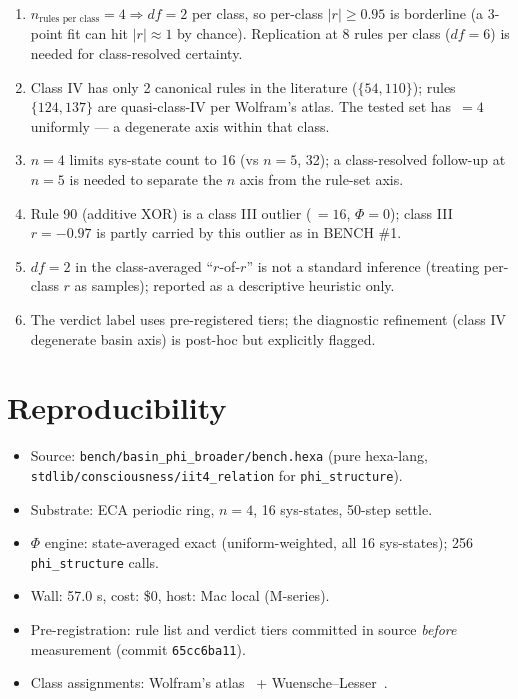 \documentclass[11pt,a4paper]{article}
\newcommand{\bigphi}{\ensuremath{\Phi}}
\newcommand{\verdictref}[1]{\texttt{\detokenize{#1}}}
\begin{document}
\begin{enumerate}
\item $n_{\text{rules per class}} = 4 \Rightarrow df = 2$ per class, so
  per-class $|r| \ge 0.95$ is borderline (a 3-point fit can hit
  $|r| \approx 1$ by chance). Replication at 8 rules per class ($df = 6$)
  is needed for class-resolved certainty.
\item Class IV has only 2 canonical rules in the literature ($\{54,
  110\}$); rules $\{124, 137\}$ are quasi-class-IV per Wolfram's atlas.
  The tested set has \verdictref{max_basin}\,$=4$ uniformly --- a
  degenerate axis within that class.
\item $n = 4$ limits sys-state count to 16 (vs $n=5$, 32); a
  class-resolved follow-up at $n=5$ is needed to separate the $n$ axis
  from the rule-set axis.
\item Rule 90 (additive XOR) is a class III outlier
  (\verdictref{max_basin}\,$=16$, $\bigphi=0$); class III $r = -0.97$ is
  partly carried by this outlier as in BENCH \#1.
\item $df = 2$ in the class-averaged ``$r$-of-$r$'' is not a standard
  inference (treating per-class $r$ as samples); reported as a
  descriptive heuristic only.
\item The verdict label uses pre-registered tiers; the diagnostic
  refinement (class IV degenerate basin axis) is post-hoc but explicitly
  flagged.
\end{enumerate}

\section{Reproducibility}
\label{sec:repro}

\begin{itemize}
\item Source: \verb|bench/basin_phi_broader/bench.hexa| (pure hexa-lang,
  \texttt{stdlib/consciousness/iit4\_relation} for \verb|phi_structure|).
\item Substrate: ECA periodic ring, $n=4$, 16 sys-states, 50-step settle.
\item \bigphi{} engine: state-averaged exact (uniform-weighted, all 16
  sys-states); 256 \verb|phi_structure| calls.
\item Wall: 57.0 s, cost: \$0, host: Mac local (M-series).
\item Pre-registration: rule list and verdict tiers committed in source
  \emph{before} measurement (commit \texttt{65cc6ba11}).
\item Class assignments: Wolfram's atlas~\citep{wolfram2002} +
  Wuensche--Lesser~\citep{wuensche1992}.
\end{itemize}
\end{document}
